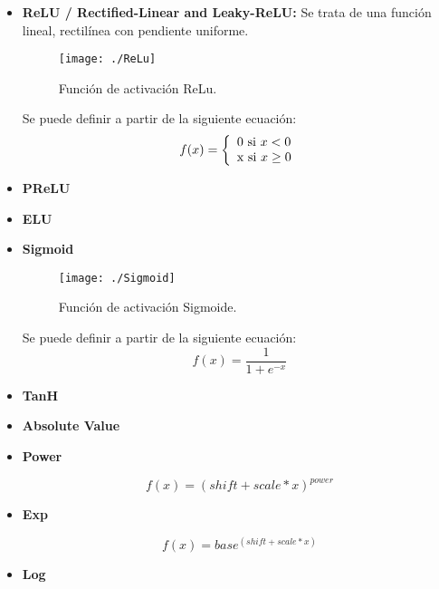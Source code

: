 \documentclass[a4paper, 12pt, oneside]{book}
\begin{document}
\begin{itemize}
\item \textbf{ReLU / Rectified-Linear and Leaky-ReLU:} Se trata de una función lineal, rectilínea con pendiente uniforme.\\

\begin{figure}[H]
\begin{center}
\texttt{[image: ./ReLu]}
\caption{Función de activación ReLu.}
\end{center}
\end{figure}

Se puede definir a partir de la siguiente ecuación:\\

\begin{equation}
f(x) = \left\lbrace
\begin{array}{ll}
\textup{0 si } x<0\\
\textup{x si } x\geq 0
\end{array}
\right.
\end{equation}

\item \textbf{PReLU}

\item \textbf{ELU}

\item \textbf{Sigmoid}

\begin{figure}[H]
\begin{center}
\texttt{[image: ./Sigmoid]}
\caption{Función de activación Sigmoide.}
\end{center}
\end{figure}

Se puede definir a partir de la siguiente ecuación:\\

\[ f(x)=\frac{1}{1 + e ^ {-x}}\]

\item \textbf{TanH}
\item \textbf{Absolute Value}
\item \textbf{Power} 

\begin{equation}
f(x) = (shift + scale * x) ^ {power}
\end{equation}

\item \textbf{Exp}

\begin{equation}
f(x) = base ^ {(shift + scale * x)}
\end{equation}
\item \textbf{Log}


\end{itemize}
\end{document}
